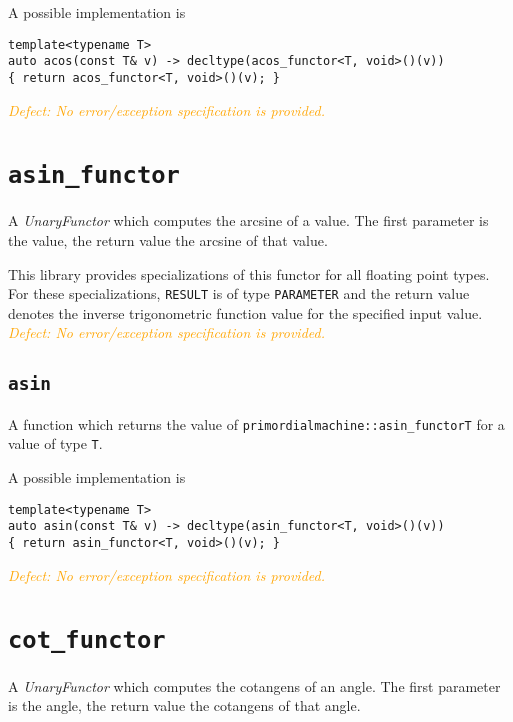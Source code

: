 \documentclass[oneside]{report}
\begin{document}
\noindent{}A possible implementation is
\begin{verbatim}
template<typename T>
auto acos(const T& v) -> decltype(acos_functor<T, void>()(v))
{ return acos_functor<T, void>()(v); }
\end{verbatim}

\noindent{}\textcolor{orange}{\textit{Defect: No error/exception specification is provided.}}
\section{\texttt{asin\_functor}}
A \textit{UnaryFunctor} which computes the
arcsine
of a value.
The first parameter is the value, the return value the arcsine of that value.

\noindent{}This library provides specializations of this functor for all floating point types.
For these specializations, \texttt{RESULT} is of type \texttt{PARAMETER} and the return value
denotes the inverse trigonometric function value for the specified input value.\\

\noindent{}\textcolor{orange}{\textit{Defect: No error/exception specification is provided.}}

\subsection{\texttt{asin}}
A function which returns the value of \texttt{primordialmachine::asin\_functor\textlangle T\textrangle}
for a value of type \texttt{T}.

\noindent{}A possible implementation is
\begin{verbatim}
template<typename T>
auto asin(const T& v) -> decltype(asin_functor<T, void>()(v))
{ return asin_functor<T, void>()(v); }
\end{verbatim}

\noindent{}\textcolor{orange}{\textit{Defect: No error/exception specification is provided.}}
\section{\texttt{cot\_functor}}
A \textit{UnaryFunctor} which computes the
cotangens of an angle.
The first parameter is the angle, the return value the cotangens of that angle.
\end{document}
